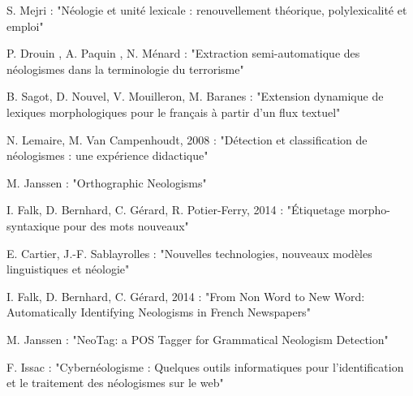 \documentclass{article}
\begin{document}
S. Mejri : "Néologie et unité lexicale : renouvellement théorique, polylexicalité et emploi"

P. Drouin , A. Paquin , N. Ménard : "Extraction semi-automatique des néologismes dans la terminologie du terrorisme"

B. Sagot, D. Nouvel, V. Mouilleron, M. Baranes : "Extension dynamique de lexiques morphologiques pour le français à partir d’un flux textuel"

N. Lemaire, M. Van Campenhoudt, 2008 : "Détection et classification de néologismes : une expérience didactique"

M. Janssen : "Orthographic Neologisms"

I. Falk, D. Bernhard, C. Gérard, R. Potier-Ferry, 2014 : "Étiquetage morpho-syntaxique pour des mots nouveaux"

E. Cartier, J.-F. Sablayrolles : "Nouvelles technologies, nouveaux modèles linguistiques et néologie"

I. Falk, D. Bernhard, C. Gérard, 2014 : "From Non Word to New Word: Automatically Identifying Neologisms in French Newspapers"

M. Janssen : "NeoTag: a POS Tagger for Grammatical Neologism Detection"

F. Issac : "Cybernéologisme : Quelques outils informatiques pour l’identification et le traitement des néologismes sur le web"
\end{document}
